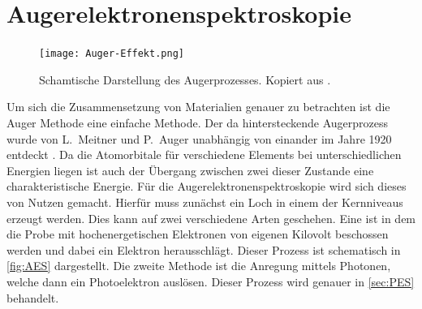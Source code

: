     \section{Augerelektronenspektroskopie} \label{sec:Auger}
        \begin{figure}
            \centering
            \texttt{[image: Auger-Effekt.png]}
            \caption{Schamtische Darstellung des Augerprozesses. Kopiert aus \cite{Auger-Bild}.}
            \label{fig:AES}
        \end{figure}
        Um sich die Zusammensetzung von Materialien genauer zu betrachten ist die Auger Methode eine einfache Methode.
        Der da hintersteckende Augerprozess wurde von L.~Meitner und P.~Auger unabhängig von einander im Jahre \num{1920} entdeckt \cite{Auger-Prozess}.
        Da die Atomorbitale für verschiedene Elements bei unterschiedlichen Energien liegen ist auch der Übergang zwischen zwei dieser Zustande eine charakteristische Energie.
        Für die Augerelektronenspektroskopie wird sich dieses von Nutzen gemacht.
        Hierfür muss zunächst ein Loch in einem der Kernniveaus erzeugt werden.
        Dies kann auf zwei verschiedene Arten geschehen.
        Eine ist in dem die Probe mit hochenergetischen Elektronen von eigenen Kilovolt beschossen werden und dabei ein Elektron herausschlägt.
        Dieser Prozess ist schematisch in \autoref{fig:AES} dargestellt.
        Die zweite Methode ist die Anregung mittels Photonen, welche dann ein Photoelektron auslösen.
        Dieser Prozess wird genauer in \autoref{sec:PES} behandelt.

